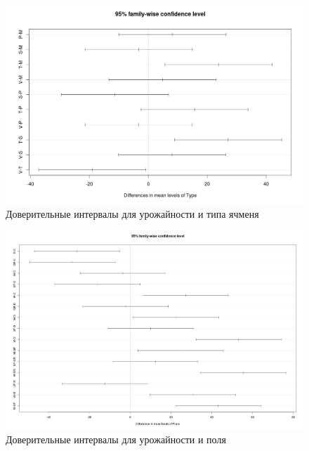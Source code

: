 \documentclass[10pt]{article}
\begin{document}
\begin{figure}[h]
  \centering
  \includegraphics[scale=0.32]{ci_type.png}
  \caption{Доверительные интервалы для урожайности и типа ячменя}
\end{figure}

\begin{figure}[h]
  \centering
  \includegraphics[scale=0.2]{ci_place.png}
  \caption{Доверительные интервалы для урожайности и поля}
\end{figure}
\end{document}
